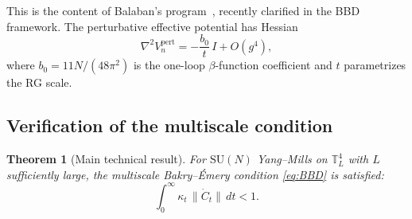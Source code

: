 \documentclass[11pt,a4paper]{article}
\theoremstyle{plain}
\newtheorem{theorem}{Theorem}[section]
\theoremstyle{definition}
\theoremstyle{remark}
\newcommand{\T}{\mathbb{T}}
\newcommand{\SU}{\mathrm{SU}}
\begin{document}
This is the content of Balaban's program~\cite{Balaban1987},
recently clarified in the BBD framework. The perturbative
effective potential has Hessian
\begin{equation}
  \nabla^2 V_n^{\mathrm{pert}} = -\frac{b_0}{t}\,I + O(g^4),
\end{equation}
where $b_0 = 11N/(48\pi^2)$ is the one-loop $\beta$-function
coefficient and $t$ parametrizes the RG scale.

\subsection{Verification of the multiscale condition}

\begin{theorem}[Main technical result]\label{thm:main-tech}
For $\SU(N)$ Yang--Mills on $\T^4_L$ with $L$ sufficiently large,
the multiscale Bakry--\'Emery condition \eqref{eq:BBD} is satisfied:
\begin{equation}
  \int_0^\infty \kappa_t\,\|\dot{C}_t\|\,dt < 1.
\end{equation}
\end{theorem}
\end{document}
